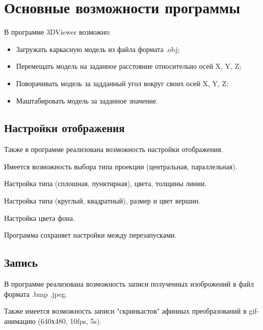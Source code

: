 \documentclass[12pt, a4paper]{article}
\begin{document}
\section{Основные возможности программы}

В программе 3DViewer возможно:
\begin{itemize}
    \item Загружать каркасную модель из файла формата .obj;
    \item Перемещать модель на заданное расстояние относительно осей X, Y, Z;
    \item Поворачивать модель за задданный угол вокруг своих осей X, Y, Z;
    \item Маштабировать модель за заданное значение.
\end{itemize}

\subsection{Настройки отображения}

Также в программе реализована возможность настройки отображения.

Имеется возможность выбора типа проекции (центральная, параллельная).

Настройка типа (сплошная, пунктирная), цвета, толщины линии.

Настройка типа (круглый, квадратный), размер и цвет вершин.

Настройка цвета фона.

Программа сохраняет настройки между перезапусками.

\subsection{Запись}

В программе реализована возможность записи полученных изоброжений в файл формата .bmp .jpeg.

Также имеется возможность записи "скринкастов" афинных преобразований в gif-анимацию (640х480, 10fps, 5s).
\end{document}
